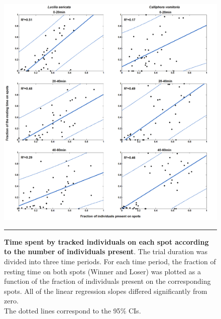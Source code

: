 \begin{figure}[p]
\centering
		\includegraphics[width=1 \textwidth]{Figures/time_number.png}
		\rule{35em}{0.5pt}
		\caption[Timenumb]{\textbf{Time spent by tracked individuals on each spot according to the number of individuals present}. The trial duration was divided into three time periods. For each time period, the fraction of resting time on both spots (Winner and Loser) was plotted as a function of the fraction of individuals present on the corresponding spots. All of the linear regression slopes differed significantly from zero. \\The dotted lines correspond to the 95$\%$ CIs.}
	\label{fig:timenumb}
\end{figure}


